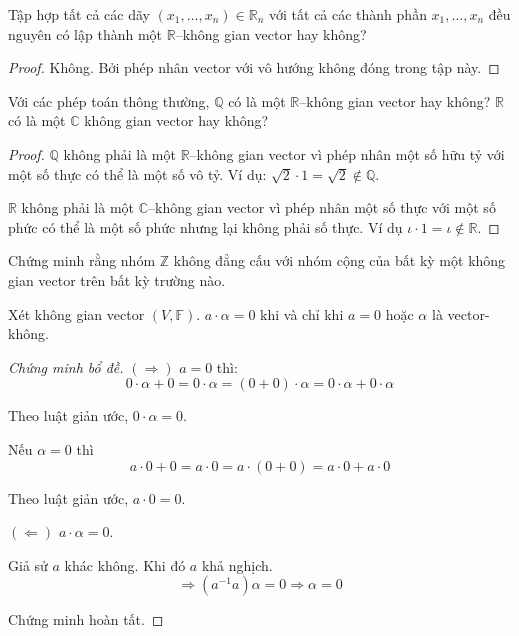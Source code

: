 \documentclass[class=linearalgebra,crop=false]{standalone}
\begin{document}
\begin{exercise}Tập hợp tất cả các dãy $(x_{1},\ldots, x_{n})\in\mathbb{R}_{n}$ với tất cả các thành phần $x_{1}, \ldots, x_{n}$ đều nguyên có lập thành một $\mathbb{R}$--không gian vector hay không?
\end{exercise}

\begin{proof}Không. Bởi phép nhân vector với vô hướng không đóng trong tập này.
\end{proof}

\begin{exercise}Với các phép toán thông thường, $\mathbb{Q}$ có là một $\mathbb{R}$--không gian vector hay không? $\mathbb{R}$ có là một $\mathbb{C}$ không gian vector hay không?
\end{exercise}

\begin{proof}$\mathbb{Q}$ không phải là một $\mathbb{R}$--không gian vector vì phép nhân một số hữu tỷ với một số thực có thể là một số vô tỷ. Ví dụ: $\sqrt{2}\cdot 1 = \sqrt{2}\not\in\mathbb{Q}$.
    \par $\mathbb{R}$ không phải là một $\mathbb{C}$--không gian vector vì phép nhân một số thực với một số phức có thể là một số phức nhưng lại không phải số thực. Ví dụ $\iota\cdot 1 = \iota\not\in\mathbb{R}$.
\end{proof}

\begin{exercise}Chứng minh rằng nhóm $\mathbb{Z}$ không đẳng cấu với nhóm cộng của bất kỳ một không gian vector trên bất kỳ trường nào.
\end{exercise}

\begin{lemma}Xét không gian vector $(V, \mathbb{F})$. $a\cdot\alpha = 0$ khi và chỉ khi $a = 0$ hoặc $\alpha$ là vector-không.
\end{lemma}

\begin{proof}[Chứng minh bổ đề]$(\Rightarrow)$ $a = 0$ thì:
    \[ 0\cdot\alpha + 0 = 0\cdot\alpha = (0 + 0)\cdot\alpha = 0\cdot\alpha + 0\cdot\alpha \]
    \par Theo luật giản ước, $0\cdot\alpha = 0$.
    \par Nếu $\alpha = 0$ thì
    \[ a\cdot 0 + 0 = a\cdot 0 = a\cdot (0 + 0) = a\cdot 0 + a\cdot 0 \]
    \par Theo luật giản ước, $a\cdot 0 = 0$.
    \bigskip
    \par $(\Leftarrow)$ $a\cdot\alpha = 0$.
    \par Giả sử $a$ khác không. Khi đó $a$ khả nghịch.
    \[ \Rightarrow (a^{-1}a)\alpha = 0 \Rightarrow \alpha = 0\]
    \par Chứng minh hoàn tất.
\end{proof}
\end{document}
